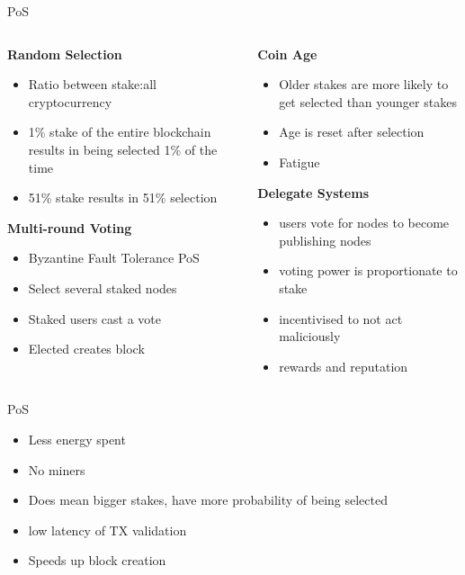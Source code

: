 \documentclass[pdf,table]{beamer}
\begin{document}
\begin{frame}{PoS}
	\begin{columns}[T]
		\begin{column}{0.48\textwidth}
			{\bf Random Selection}
			\begin{itemize}
				\item Ratio between stake:all cryptocurrency
				\item 1\% stake of the entire blockchain results in being selected 1\% of the time
				\item 51\% stake results in 51\% selection
			\end{itemize}
			{\bf Multi-round Voting}
			\begin{itemize}
				\item Byzantine Fault Tolerance PoS \cite{bahsoun2015making}
				\item Select several staked nodes
				\item Staked users cast a vote
				\item Elected creates block
			\end{itemize}
		\end{column}
		\begin{column}{0.48\textwidth}
			{\bf Coin Age}
			\begin{itemize}
				\item Older stakes are more likely to get selected than younger stakes
				\item Age is reset after selection
				\item Fatigue
			\end{itemize}
			{\bf Delegate Systems}
			\begin{itemize}
				\item users vote for nodes to become publishing nodes
				\item voting power is proportionate to stake
				\item incentivised to not act maliciously
				\item rewards and reputation
			\end{itemize}
		\end{column}
	\end{columns}	
\end{frame}



\begin{frame}{PoS}
	\begin{itemize}
		\item Less energy spent
		\item No miners
		\item Does mean bigger stakes, have more probability of being selected
		\item low latency of TX validation
		\item Speeds up block creation
	\end{itemize}
\end{frame}
\end{document}
